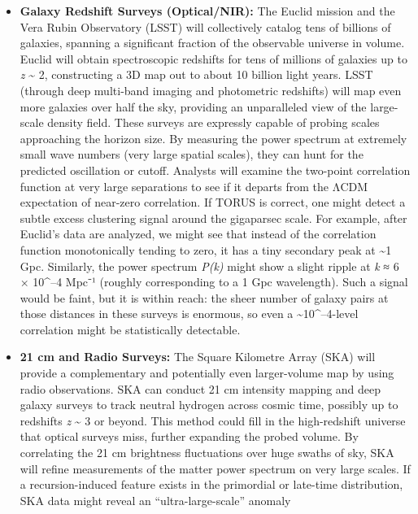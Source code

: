 \documentclass[]{article}
\begin{document}
\begin{itemize}
\item
  \textbf{Galaxy Redshift Surveys (Optical/NIR):} The Euclid mission and
  the Vera Rubin Observatory (LSST) will collectively catalog tens of
  billions of galaxies, spanning a significant fraction of the
  observable universe in volume. Euclid will obtain spectroscopic
  redshifts for tens of millions of galaxies up to \emph{z}
  \textasciitilde{} 2, constructing a 3D map out to about 10 billion
  light years. LSST (through deep multi-band imaging and photometric
  redshifts) will map even more galaxies over half the sky, providing an
  unparalleled view of the large-scale density field. These surveys are
  expressly capable of probing scales approaching the horizon size. By
  measuring the power spectrum at extremely small wave numbers (very
  large spatial scales), they can hunt for the predicted oscillation or
  cutoff. Analysts will examine the two-point correlation function at
  very large separations to see if it departs from the ΛCDM expectation
  of near-zero correlation. If TORUS is correct, one might detect a
  subtle excess clustering signal around the gigaparsec scale. For
  example, after Euclid's data are analyzed, we might see that instead
  of the correlation function monotonically tending to zero, it has a
  tiny secondary peak at \textasciitilde{}1 Gpc. Similarly, the power
  spectrum \emph{P(k)} might show a slight ripple at \emph{k} ≈ 6 ×
  10\^{}--4 Mpc⁻¹ (roughly corresponding to a 1 Gpc wavelength). Such a
  signal would be faint, but it is within reach: the sheer number of
  galaxy pairs at those distances in these surveys is enormous, so even
  a \textasciitilde{}10\^{}--4-level correlation might be statistically
  detectable.
\item
  \textbf{21 cm and Radio Surveys:} The Square Kilometre Array (SKA)
  will provide a complementary and potentially even larger-volume map by
  using radio observations. SKA can conduct 21 cm intensity mapping and
  deep galaxy surveys to track neutral hydrogen across cosmic time,
  possibly up to redshifts \emph{z} \textasciitilde{} 3 or beyond. This
  method could fill in the high-redshift universe that optical surveys
  miss, further expanding the probed volume. By correlating the 21 cm
  brightness fluctuations over huge swaths of sky, SKA will refine
  measurements of the matter power spectrum on very large scales. If a
  recursion-induced feature exists in the primordial or late-time
  distribution, SKA data might reveal an ``ultra-large-scale'' anomaly

\end{itemize}
\end{document}
